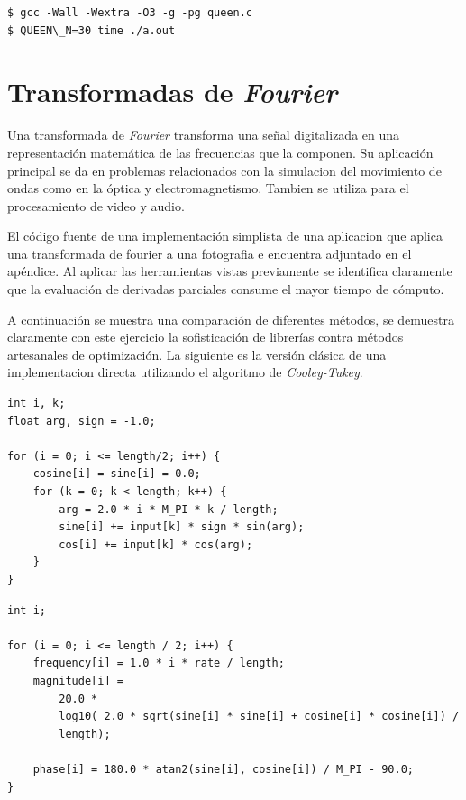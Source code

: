 \documentclass[a4paper]{report}
\begin{document}
\begin{verbatim}
$ gcc -Wall -Wextra -O3 -g -pg queen.c
$ QUEEN\_N=30 time ./a.out
\end{verbatim}

\section{Transformadas de {\it Fourier}}

Una transformada de {\it Fourier} \cite{fourier} transforma una se\~nal
digitalizada en una representaci\'on matem\'atica de las frecuencias que la
componen. Su aplicaci\'on principal se da en problemas relacionados con la simulacion del
movimiento de ondas como en la \'optica y electromagnetismo. Tambien se utiliza para el procesamiento de video y audio.

\bigskip

El c\'odigo fuente de una implementaci\'on simplista de una aplicacion que aplica una transformada de fourier a una fotografia 
e encuentra adjuntado en el ap\'endice. Al aplicar las herramientas vistas previamente se identifica
claramente que la evaluaci\'on de derivadas parciales consume el mayor tiempo
de c\'omputo.

\bigskip

A continuaci\'on se muestra una comparaci\'on de diferentes m\'etodos, se
demuestra claramente con este ejercicio la sofisticaci\'on de librer\'ias
contra m\'etodos artesanales de optimizaci\'on. La siguiente es la versi\'on
cl\'asica de una implementacion directa utilizando el algoritmo de
{\it Cooley-Tukey}.

\begin{verbatim}
int i, k;
float arg, sign = -1.0;

for (i = 0; i <= length/2; i++) {
    cosine[i] = sine[i] = 0.0;
    for (k = 0; k < length; k++) {
        arg = 2.0 * i * M_PI * k / length;
        sine[i] += input[k] * sign * sin(arg);
        cos[i] += input[k] * cos(arg);
    }
}
\end{verbatim}

\begin{verbatim}
int i;

for (i = 0; i <= length / 2; i++) {
    frequency[i] = 1.0 * i * rate / length;
    magnitude[i] =
        20.0 *
        log10( 2.0 * sqrt(sine[i] * sine[i] + cosine[i] * cosine[i]) /
        length);

    phase[i] = 180.0 * atan2(sine[i], cosine[i]) / M_PI - 90.0;
}
\end{verbatim}
\end{document}
